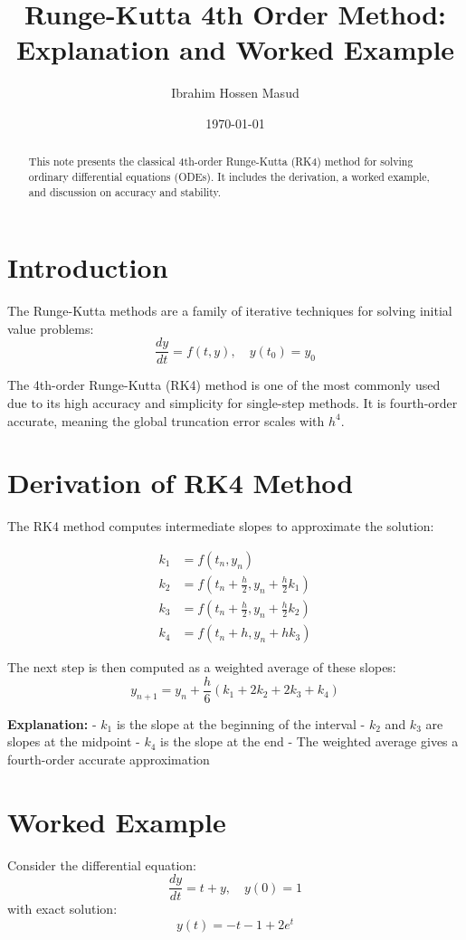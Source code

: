 \documentclass[11pt,a4paper]{article}
\title{Runge-Kutta 4th Order Method: Explanation and Worked Example}
\author{Ibrahim Hossen Masud}
\date{\today}
\begin{document}
\maketitle

\begin{abstract}
This note presents the classical 4th-order Runge-Kutta (RK4) method for solving ordinary differential equations (ODEs). 
It includes the derivation, a worked example, and discussion on accuracy and stability.
\end{abstract}

\section{Introduction}
The Runge-Kutta methods are a family of iterative techniques for solving initial value problems:
\[
\frac{dy}{dt} = f(t,y), \quad y(t_0) = y_0
\]

The 4th-order Runge-Kutta (RK4) method is one of the most commonly used due to its high accuracy and simplicity for single-step methods. It is fourth-order accurate, meaning the global truncation error scales with \(h^4\).

\section{Derivation of RK4 Method}
The RK4 method computes intermediate slopes to approximate the solution:

\[
\begin{aligned}
k_1 &= f(t_n, y_n) \\
k_2 &= f\left(t_n + \frac{h}{2}, y_n + \frac{h}{2} k_1\right) \\
k_3 &= f\left(t_n + \frac{h}{2}, y_n + \frac{h}{2} k_2\right) \\
k_4 &= f(t_n + h, y_n + h k_3)
\end{aligned}
\]

The next step is then computed as a weighted average of these slopes:
\[
y_{n+1} = y_n + \frac{h}{6} \left(k_1 + 2k_2 + 2k_3 + k_4\right)
\]

\textbf{Explanation:}  
- \(k_1\) is the slope at the beginning of the interval  
- \(k_2\) and \(k_3\) are slopes at the midpoint  
- \(k_4\) is the slope at the end  
- The weighted average gives a fourth-order accurate approximation

\section{Worked Example}
Consider the differential equation:
\[
\frac{dy}{dt} = t + y, \quad y(0) = 1
\]
with exact solution:
\[
y(t) = -t - 1 + 2 e^t
\]
\end{document}
